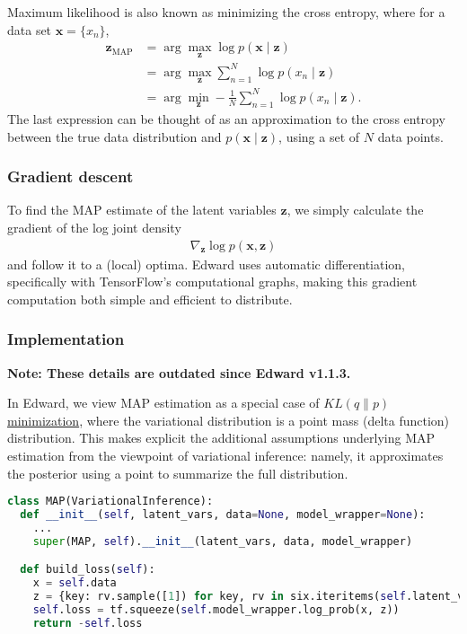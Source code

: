 Maximum likelihood is also known as minimizing the cross entropy, where
for a data set $\mathbf{x}=\{x_n\}$,
\begin{align*}
  \mathbf{z}_\text{MAP}
  &=
  \arg \max_\mathbf{z}
  \log p(\mathbf{x}\mid \mathbf{z})
  \\
  &=
  \arg \max_\mathbf{z}
  \sum_{n=1}^N \log p(x_n\mid \mathbf{z})
  \\
  &=
  \arg \min_\mathbf{z}
  -\frac{1}{N}\sum_{n=1}^N \log p(x_n\mid \mathbf{z}).
\end{align*}
The last expression can be thought of as an approximation to the cross
entropy between the true data distribution and $p(\mathbf{x}\mid \mathbf{z})$,
using a set of $N$ data points.

\subsubsection{Gradient descent}

To find the MAP estimate of the latent variables $\mathbf{z}$, we simply
calculate the gradient of the log joint density
\begin{align*}
  \nabla_\mathbf{z}
  \log p(\mathbf{x}, \mathbf{z})
\end{align*}
and follow it to a (local) optima.
Edward uses automatic differentiation, specifically with TensorFlow's
computational graphs, making this gradient computation both simple and
efficient to distribute.

\subsubsection{Implementation}

\textbf{Note: These details are outdated since Edward v1.1.3.}

In Edward, we view MAP estimation as a special case of
\href{/tutorials/klqp}{$KL(q\|p)$ minimization}, where the variational
distribution is a point mass (delta function) distribution. This makes
explicit the additional assumptions underlying MAP estimation from the
viewpoint of variational inference: namely, it approximates the
posterior using a point to summarize the full distribution.

\begin{lstlisting}[language=Python]
class MAP(VariationalInference):
  def __init__(self, latent_vars, data=None, model_wrapper=None):
    ...
    super(MAP, self).__init__(latent_vars, data, model_wrapper)

  def build_loss(self):
    x = self.data
    z = {key: rv.sample([1]) for key, rv in six.iteritems(self.latent_vars)}
    self.loss = tf.squeeze(self.model_wrapper.log_prob(x, z))
    return -self.loss
\end{lstlisting}

